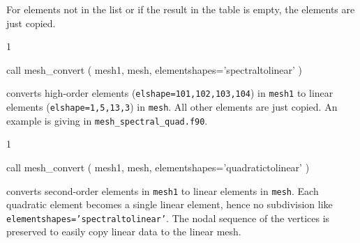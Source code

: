 For elements not in the list or if the result in the table is empty, the
elements are just copied.
\begin{listing}{1}

  call mesh_convert ( mesh1, mesh, elementshapes='spectraltolinear' ) 

\end{listing}
converts high-order elements (\texttt{elshape=101,102,103,104})
in \texttt{mesh1} to linear 
elements (\texttt{elshape=1,5,13,3}) in \texttt{mesh}. All other elements are
just copied. An example is giving in \texttt{mesh\_spectral\_quad.f90}.
\begin{listing}{1}

  call mesh_convert ( mesh1, mesh, elementshapes='quadratictolinear' ) 

\end{listing}
converts second-order elements in \texttt{mesh1} to linear  elements in \texttt{mesh}. Each quadratic element becomes a single linear element, hence no subdivision like \texttt{elementshapes='spectraltolinear'}. The nodal sequence of the vertices is preserved to easily copy linear data to the linear mesh.

